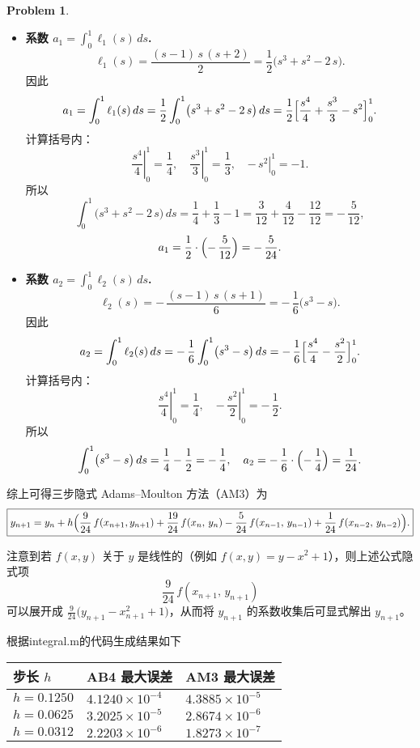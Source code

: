 \documentclass[a4paper]{article}
\theoremstyle{definition}
\newtheorem{problem}{Problem}
\theoremstyle{plain}
\newcommand{\<}{\left<}
\renewcommand{\>}{\right>}
\numberwithin{equation}{problem}
\begin{document}
\begin{problem}
\begin{itemize}
  \item \textbf{系数 $a_{1} = \displaystyle\int_{0}^{1} \ell_{1}(s)\,ds$.}  
    \[
    \ell_{1}(s)
    = \frac{(s - 1)\,s\,(s + 2)}{2}
    = \frac{1}{2}\bigl(s^3 + s^2 - 2\,s\bigr).
    \]
    因此
    \[
    a_{1} 
    = \int_{0}^{1} \ell_{1}(s)\,ds
    = \frac{1}{2} \int_{0}^{1} \bigl(s^3 + s^2 - 2\,s\bigr)\,ds
    = \frac{1}{2} \Bigl[
      \frac{s^4}{4} + \frac{s^3}{3} - s^2
    \Bigr]_{0}^{1}.
    \]
    计算括号内：
    \[
    \left.\frac{s^4}{4}\right|_{0}^{1} = \frac{1}{4},\quad
    \left.\frac{s^3}{3}\right|_{0}^{1} = \frac{1}{3},\quad
    \left.-\,s^2\right|_{0}^{1} = -1.
    \]
    所以
    \[
    \int_{0}^{1} \bigl(s^3 + s^2 - 2\,s\bigr)\,ds
    = \frac{1}{4} + \frac{1}{3} - 1
    = \frac{3}{12} + \frac{4}{12} - \frac{12}{12}
    = -\,\frac{5}{12},
    \]
    \[
    a_{1} = \frac{1}{2} \cdot \Bigl(-\,\frac{5}{12}\Bigr)
    = -\,\frac{5}{24}.
    \]
  
  \item \textbf{系数 $a_{2} = \displaystyle\int_{0}^{1} \ell_{2}(s)\,ds$.}  
    \[
    \ell_{2}(s)
    = -\,\frac{(s - 1)\,s\,(s + 1)}{6}
    = -\,\frac{1}{6}\bigl(s^3 - s\bigr).
    \]
    因此
    \[
    a_{2} 
    = \int_{0}^{1} \ell_{2}(s)\,ds
    = -\,\frac{1}{6} \int_{0}^{1} \bigl(s^3 - s\bigr)\,ds
    = -\,\frac{1}{6} \Bigl[
      \frac{s^4}{4} - \frac{s^2}{2}
    \Bigr]_{0}^{1}.
    \]
    计算括号内：
    \[
    \left.\frac{s^4}{4}\right|_{0}^{1} = \frac{1}{4},\quad
    \left.-\,\frac{s^2}{2}\right|_{0}^{1} = -\,\frac{1}{2}.
    \]
    所以
    \[
    \int_{0}^{1} \bigl(s^3 - s\bigr)\,ds
    = \frac{1}{4} - \frac{1}{2} 
    = -\,\frac{1}{4},
    \quad
    a_{2} = -\,\frac{1}{6} \cdot \Bigl(-\,\frac{1}{4}\Bigr)
    = \frac{1}{24}.
    \]
\end{itemize}

综上可得三步隐式 Adams–Moulton 方法（AM3）为
\[
\boxed{
y_{n+1} 
= y_n 
+ h \Bigl(
  \frac{9}{24}\,f(x_{n+1},y_{n+1})
+ \frac{19}{24}\,f(x_{n},\,y_{n})
- \frac{5}{24}\,f(x_{n-1},\,y_{n-1})
+ \frac{1}{24}\,f(x_{n-2},\,y_{n-2})
\Bigr).
}
\]

注意到若 $f(x,y)$ 关于 $y$ 是线性的（例如 $f(x,y)=y - x^2 +1$），则上述公式隐式项
\[
\frac{9}{24}\,f(x_{n+1},\,y_{n+1})
\]
可以展开成 $\frac{9}{24}\bigl(y_{n+1} - x_{n+1}^2 +1\bigr)$，从而将 $y_{n+1}$ 的系数收集后可显式解出 $y_{n+1}$。

根据integral.m的代码生成结果如下

\begin{tabular}{|l|l|l|}
\hline
\textbf{步长 $h$} & \textbf{AB4 最大误差} & \textbf{AM3 最大误差} \\
\hline
$h = 0.1250$ & $4.1240 \times 10^{-4}$ & $4.3885 \times 10^{-5}$ \\
$h = 0.0625$ & $3.2025 \times 10^{-5}$ & $2.8674 \times 10^{-6}$ \\
$h = 0.0312$ & $2.2203 \times 10^{-6}$ & $1.8273 \times 10^{-7}$ \\
\hline
\end{tabular}



\end{problem}
\end{document}
